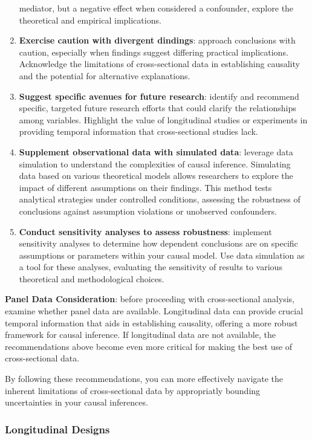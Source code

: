 \documentclass[
  singlecolumn]{article}
\begin{document}
\begin{enumerate}
  mediator, but a negative effect when considered a confounder, explore
  the theoretical and empirical implications.
\item
  \textbf{Exercise caution with divergent dindings}: approach
  conclusions with caution, especially when findings suggest differing
  practical implications. Acknowledge the limitations of cross-sectional
  data in establishing causality and the potential for alternative
  explanations.
\item
  \textbf{Suggest specific avenues for future research}: identify and
  recommend specific, targeted future research efforts that could
  clarify the relationships among variables. Highlight the value of
  longitudinal studies or experiments in providing temporal information
  that cross-sectional studies lack.
\item
  \textbf{Supplement observational data with simulated data}: leverage
  data simulation to understand the complexities of causal inference.
  Simulating data based on various theoretical models allows researchers
  to explore the impact of different assumptions on their findings. This
  method tests analytical strategies under controlled conditions,
  assessing the robustness of conclusions against assumption violations
  or unobserved confounders.
\item
  \textbf{Conduct sensitivity analyses to assess robustness}: implement
  sensitivity analyses to determine how dependent conclusions are on
  specific assumptions or parameters within your causal model. Use data
  simulation as a tool for these analyses, evaluating the sensitivity of
  results to various theoretical and methodological choices.
\end{enumerate}

\textbf{Panel Data Consideration}: before proceeding with
cross-sectional analysis, examine whether panel data are available.
Longitudinal data can provide crucial temporal information that aids in
establishing causality, offering a more robust framework for causal
inference. If longitudinal data are not available, the recommendations
above become even more critical for making the best use of
cross-sectional data.

By following these recommendations, you can more effectively navigate
the inherent limitations of cross-sectional data by appropriatly
bounding uncertainties in your causal inferences.

\subsubsection{Longitudinal Designs}\label{longitudinal-designs}
\end{document}
